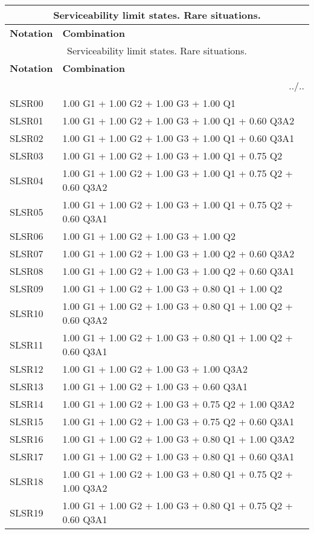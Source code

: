 \begin{center}
\begin{small}
\begin{longtable}{|l|p{10cm}|}
\hline
\multicolumn{2}{|c|}{Serviceability limit states. Rare situations.}\\
\hline
\textbf{Notation} & \textbf{Combination} \\
\hline
\endfirsthead
\hline
\multicolumn{2}{|c|}{Serviceability limit states. Rare situations.}\\
\hline
\textbf{Notation} & \textbf{Combination} \\
\hline
\endhead
\hline \multicolumn{2}{|r|}{{../..}} \\ \hline
\endfoot
\hline
\endlastfoot
SLSR00 & 1.00 G1 + 1.00 G2 + 1.00 G3 + 1.00 Q1\\
SLSR01 & 1.00 G1 + 1.00 G2 + 1.00 G3 + 1.00 Q1 + 0.60 Q3A2\\
SLSR02 & 1.00 G1 + 1.00 G2 + 1.00 G3 + 1.00 Q1 + 0.60 Q3A1\\
SLSR03 & 1.00 G1 + 1.00 G2 + 1.00 G3 + 1.00 Q1 + 0.75 Q2\\
SLSR04 & 1.00 G1 + 1.00 G2 + 1.00 G3 + 1.00 Q1 + 0.75 Q2 + 0.60 Q3A2\\
SLSR05 & 1.00 G1 + 1.00 G2 + 1.00 G3 + 1.00 Q1 + 0.75 Q2 + 0.60 Q3A1\\
SLSR06 & 1.00 G1 + 1.00 G2 + 1.00 G3 + 1.00 Q2\\
SLSR07 & 1.00 G1 + 1.00 G2 + 1.00 G3 + 1.00 Q2 + 0.60 Q3A2\\
SLSR08 & 1.00 G1 + 1.00 G2 + 1.00 G3 + 1.00 Q2 + 0.60 Q3A1\\
SLSR09 & 1.00 G1 + 1.00 G2 + 1.00 G3 + 0.80 Q1 + 1.00 Q2\\
SLSR10 & 1.00 G1 + 1.00 G2 + 1.00 G3 + 0.80 Q1 + 1.00 Q2 + 0.60 Q3A2\\
SLSR11 & 1.00 G1 + 1.00 G2 + 1.00 G3 + 0.80 Q1 + 1.00 Q2 + 0.60 Q3A1\\
SLSR12 & 1.00 G1 + 1.00 G2 + 1.00 G3 + 1.00 Q3A2\\
SLSR13 & 1.00 G1 + 1.00 G2 + 1.00 G3 + 0.60 Q3A1\\
SLSR14 & 1.00 G1 + 1.00 G2 + 1.00 G3 + 0.75 Q2 + 1.00 Q3A2\\
SLSR15 & 1.00 G1 + 1.00 G2 + 1.00 G3 + 0.75 Q2 + 0.60 Q3A1\\
SLSR16 & 1.00 G1 + 1.00 G2 + 1.00 G3 + 0.80 Q1 + 1.00 Q3A2\\
SLSR17 & 1.00 G1 + 1.00 G2 + 1.00 G3 + 0.80 Q1 + 0.60 Q3A1\\
SLSR18 & 1.00 G1 + 1.00 G2 + 1.00 G3 + 0.80 Q1 + 0.75 Q2 + 1.00 Q3A2\\
SLSR19 & 1.00 G1 + 1.00 G2 + 1.00 G3 + 0.80 Q1 + 0.75 Q2 + 0.60 Q3A1\\
\hline
\end{longtable}
\end{small}
\end{center}
